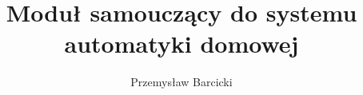 \documentclass[inzynier,druk]{dyplom}
\author{Przemysław Barcicki}
\title{Moduł samouczący do systemu automatyki domowej}
\begin{document}
\maketitle



\tableofcontents









\listoffigures
\listoflistings
\listoftables

\appendixpage
\appendix

\end{document}
